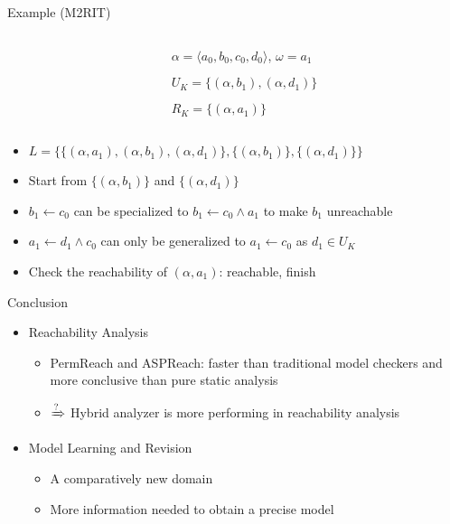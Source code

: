\documentclass[8pt]{beamer}
\begin{document}
\begin{frame}{Example (M2RIT)}
\begin{columns}
\begin{column}{0.6\textwidth}

\end{column}
\begin{column}{0.4\textwidth}
    $\alpha=\langle a_0,b_0,c_0,d_0\rangle$, $\omega=a_1$
    
	$U_K=\{(\alpha,b_1),(\alpha,d_1)\}$
	
	$R_K=\{(\alpha,a_1)\}$
\end{column}
\end{columns}

        \vspace{0.5cm}
        \centering
        
        
        \vspace{0.5cm}
    
     \begin{itemize}
        \item $L=\{\{(\alpha,a_1),(\alpha,b_1),(\alpha,d_1)\},\{(\alpha,b_1)\},\{(\alpha,d_1)\}\}$
        \item Start from $\{(\alpha,b_1)\}$ and $\{(\alpha,d_1)\}$
        \item $b_1\gets c_0$ can be specialized to $b_1\gets c_0\land a_1$ to make $b_1$ unreachable
        \item $a_1\gets d_1 \land c_0$ can only be generalized to $a_1 \gets c_0$ as $d_1\in U_K$
        \item Check the reachability of $(\alpha,a_1)$: reachable, finish
    \end{itemize}
\end{frame}

\begin{frame}{Conclusion}
\begin{itemize}
    \item Reachability Analysis
    \begin{itemize}
        \item PermReach and ASPReach: faster than traditional model checkers and more conclusive than pure static analysis
        \item $\xRightarrow{\text{?}}$ Hybrid analyzer is more performing in reachability analysis
    \end{itemize}
    \item Model Learning and Revision
    \begin{itemize}
        \item A comparatively new domain
        \item More information needed to obtain a precise model 
    \end{itemize}
\end{itemize}

\end{frame}

%    
%    
\end{document}
